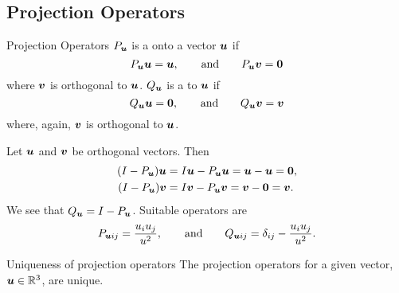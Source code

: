 \subsection{Projection Operators}
\begin{definition}{Projection Operators}{}
    \(P_{\bm{u}}\) is a  onto a vector \(\bm{u}\) if
    \[P_{\bm{u}}\bm{u} = \bm{u}, \qquad\text{and}\qquad P_{\bm{u}}\bm{v} = \bm{0}\]
    where \(\bm{v}\) is orthogonal to \(\bm{u}\).
    \(Q_{\bm{u}}\) is a  to \(\bm{u}\) if
    \[Q_{\bm{u}}\bm{u} = \bm{0}, \qquad\text{and}\qquad Q_{\bm{u}}\bm{v} = \bm{v}\]
    where, again, \(\bm{v}\) is orthogonal to \(\bm{u}\).
\end{definition}
Let \(\bm{u}\) and \(\bm{v}\) be orthogonal vectors.
Then
\begin{align*}
    (I - P_{\bm{u}})\bm{u} &= I\bm{u} - P_{\bm{u}}\bm{u} = \bm{u} - \bm{u} = \bm{0},\\
    (I - P_{\bm{u}})\bm{v} &= I\bm{v} - P_{\bm{u}}\bm{v} = \bm{v} - \bm{0} = \bm{v}.
\end{align*}
We see that \(Q_{\bm{u}} = I - P_{\bm{u}}\).
Suitable operators are
\[P_{\bm{u}ij} = \frac{u_iu_j}{u^2}, \qquad\text{and}\qquad Q_{\bm{u}ij} = \delta_{ij} - \frac{u_iu_j}{u^2}.\]
\begin{lemma}{Uniqueness of projection operators}{}
    The projection operators for a given vector, \(\bm{u}\in\mathbb{R}^3\), are unique.
\end{lemma}
